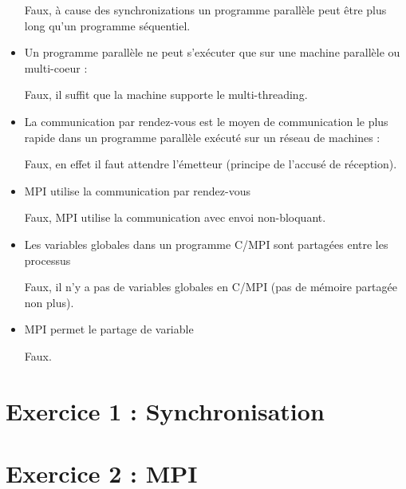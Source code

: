 \documentclass[a4paper]{article}
\begin{document}
\begin{itemize}
  Faux, à cause des synchronizations un programme parallèle peut être plus long qu'un programme séquentiel.

\item Un programme parallèle ne peut s'exécuter que sur une machine parallèle ou multi-coeur :
  
  Faux, il suffit que la machine supporte le multi-threading.

\item La communication par rendez-vous est le moyen de communication le plus rapide dans un programme parallèle exécuté sur un réseau de machines :
  
  Faux, en effet il faut attendre l'émetteur (principe de l'accusé de réception).

\item MPI utilise la communication par rendez-vous
  
  Faux, MPI utilise la communication avec envoi non-bloquant.

\item Les variables globales dans un programme C/MPI sont partagées entre les processus

  Faux, il n'y a pas de variables globales en C/MPI (pas de mémoire partagée non plus).

\item MPI permet le partage de variable

  Faux.

\end{itemize}

\section{Exercice 1 : Synchronisation}



\section{Exercice 2 : MPI}
\end{document}
